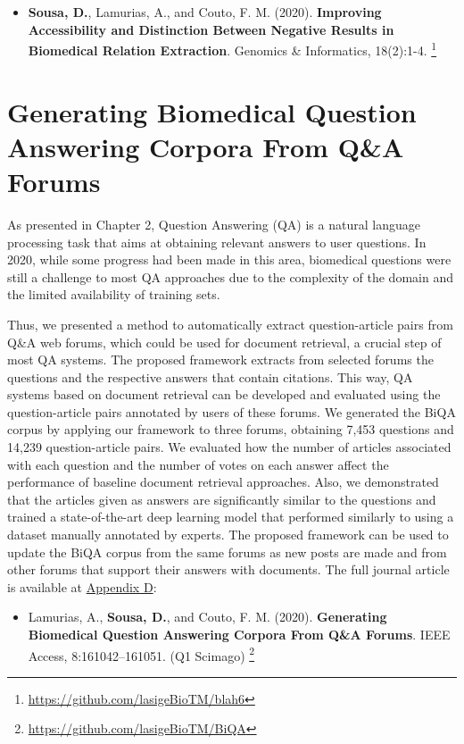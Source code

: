 \begin{itemize}[label=]
  \item \textbf{Sousa, D.}, Lamurias, A., and Couto, F. M. (2020). \textbf{Improving Accessibility and Distinction Between Negative Results in Biomedical Relation Extraction}. Genomics \& Informatics, 18(2):1-4. \citep{sousa2020improving} \footnote{\url{https://github.com/lasigeBioTM/blah6}}
\end{itemize}


\section{Generating Biomedical Question Answering Corpora From Q\&A Forums}

As presented in Chapter 2, Question Answering (QA) is a natural language processing task that aims at obtaining relevant answers to user questions. In 2020, while some progress had been made in this area, biomedical questions were still a challenge to most QA approaches due to the complexity of the domain and the limited availability of training sets. 

Thus, we presented a method to automatically extract question-article pairs from Q\&A web forums, which could be used for document retrieval, a crucial step of most QA systems. The proposed framework extracts from selected forums the questions and the respective answers that contain citations. This way, QA systems based on document retrieval can be developed and evaluated using the question-article pairs annotated by users of these forums. We generated the BiQA corpus by applying our framework to three forums, obtaining 7,453 questions and 14,239 question-article pairs. We evaluated how the number of articles associated with each question and the number of votes on each answer affect the performance of baseline document retrieval approaches. Also, we demonstrated that the articles given as answers are significantly similar to the questions and trained a state-of-the-art deep learning model that performed similarly to using a dataset manually annotated by experts. The proposed framework can be used to update the BiQA corpus from the same forums as new posts are made and from other forums that support their answers with documents. The full journal article is available at \hyperlink{AD}{Appendix D}:

\begin{itemize}[label=]
    \item{Lamurias, A., \textbf{Sousa, D.}, and Couto, F. M. (2020). \textbf{Generating Biomedical Question Answering Corpora From Q\&A Forums}. IEEE Access, 8:161042–161051. (Q1 Scimago) \citep{lamurias2020generating}} \footnote{\url{https://github.com/lasigeBioTM/BiQA}}
\end{itemize}

